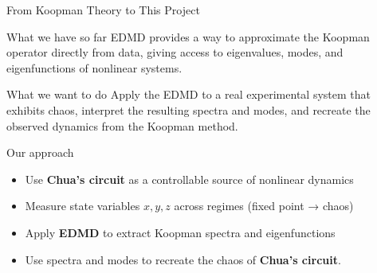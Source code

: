 \documentclass[aspectratio=169,10pt]{beamer}
\begin{document}
\begin{frame}{From Koopman Theory to This Project}
    \begin{block}{What we have so far}
        EDMD provides a way to approximate the Koopman operator directly from data,
        giving access to eigenvalues, modes, and eigenfunctions of nonlinear systems.
    \end{block}

    \vspace{0.2cm}
    \begin{block}{What we want to do}
        Apply the EDMD to a real experimental system that exhibits chaos, interpret the resulting spectra and modes, and recreate the observed dynamics from the Koopman method.
    \end{block}

    \vspace{0.2cm}
    \begin{alertblock}{Our approach}
        \begin{itemize}
            \item Use \textbf{Chua’s circuit} as a controllable source of nonlinear dynamics
            \item Measure state variables \(x,y,z\) across regimes (fixed point → chaos)
            \item Apply \textbf{EDMD} to extract Koopman spectra and eigenfunctions
            \item Use spectra and modes to recreate the chaos of \textbf{Chua’s circuit}.
        \end{itemize}
    \end{alertblock}
    \vspace{0.1cm}
   \end{frame}
\end{document}

